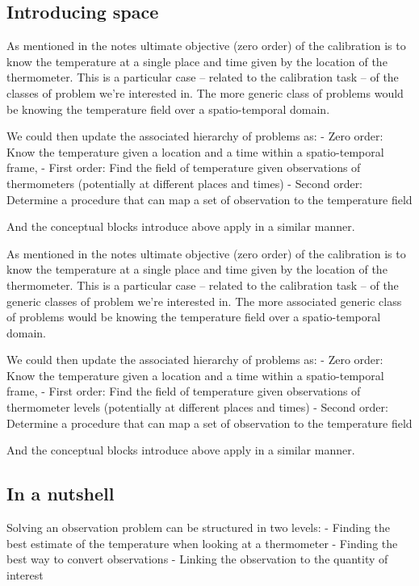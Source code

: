 \begin{bibunit}
\subsection{Introducing space}
  As mentioned in the notes ultimate objective (zero order) of the calibration is to know the temperature at a single place and time given by the location of the thermometer. 
  This is a particular case  -- related to the calibration task  -- of the classes of problem we're interested in.
  The more generic class of problems would be knowing the temperature field over a spatio-temporal domain.

We could then update the associated hierarchy of problems as:
  - Zero order: Know the temperature given a location and a time within a spatio-temporal frame, 
  - First order: Find the field of temperature given observations of thermometers (potentially at different places and times)
  - Second order: Determine a procedure that can map a set of observation to the temperature field

And the conceptual blocks introduce above apply in a similar manner.


  As mentioned in the notes ultimate objective (zero order) of the calibration is to know the temperature at a single place and time given by the location of the thermometer. 
  This is a particular case  -- related to the calibration task  -- of the generic classes of problem we're interested in.
  The more associated generic class of problems would be knowing the temperature field over a spatio-temporal domain.

We could then update the associated hierarchy of problems as:
  - Zero order: Know the temperature given a location and a time within a spatio-temporal frame, 
  - First order: Find the field of temperature given observations of thermometer levels (potentially at different places and times)
  - Second order: Determine a procedure that can map a set of observation to the temperature field

And the conceptual blocks introduce above apply in a similar manner.


\subsection{In a nutshell}
Solving an observation problem can be structured in two levels:
- Finding the best estimate of the temperature when looking at a thermometer
- Finding the best way to convert observations 
- Linking the observation to the quantity of interest


\end{bibunit}
